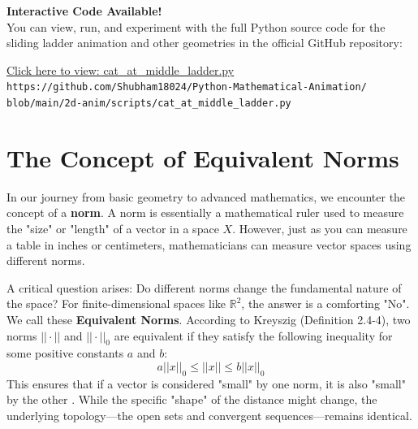 \documentclass[12pt, a4paper]{report}
\begin{document}
\begin{mdframed}[backgroundcolor=gray!10, linecolor=black, linewidth=1pt, roundcorner=5pt]
    \centering
    \textbf{Interactive Code Available!} \\
    \vspace{0.2cm}
    You can view, run, and experiment with the full Python source code for the sliding ladder animation and other geometries in the official GitHub repository: \\
    \vspace{0.3cm}
    
    \small 
    \href{https://github.com/Shubham18024/Python-Mathematical-Animation/blob/main/2d-anim/scripts/cat_at_middle_ladder.py}{
        \color{blue}\underline{Click here to view: cat\_at\_middle\_ladder.py}
    } \\
    \vspace{0.1cm}
    \scriptsize \texttt{https://github.com/Shubham18024/Python-Mathematical-Animation/} \\
    \texttt{blob/main/2d-anim/scripts/cat\_at\_middle\_ladder.py}
\end{mdframed}


\section{The Concept of Equivalent Norms}

In our journey from basic geometry to advanced mathematics, we encounter the concept of a \textbf{norm}. A norm is essentially a mathematical ruler used to measure the "size" or "length" of a vector in a space $X$. However, just as you can measure a table in inches or centimeters, mathematicians can measure vector spaces using different norms.

A critical question arises: Do different norms change the fundamental nature of the space? For finite-dimensional spaces like $\mathbb{R}^2$, the answer is a comforting "No". We call these \textbf{Equivalent Norms}. According to Kreyszig \cite{kreyszig1989} (Definition 2.4-4), two norms $||\cdot||$ and $||\cdot||_0$ are equivalent if they satisfy the following inequality for some positive constants $a$ and $b$:
\begin{equation}
    a||x||_{0} \le ||x|| \le b||x||_{0}
\end{equation}
This ensures that if a vector is considered "small" by one norm, it is also "small" by the other \cite{kreyszig1989}. While the specific "shape" of the distance might change, the underlying topology—the open sets and convergent sequences—remains identical.
\end{document}
